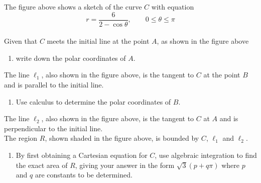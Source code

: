 \documentclass[leqno]{article}
\begin{document}
\begin{enumerate}[
  label=\textbf{\arabic*.},
  leftmargin=*,
  topsep=0pt,
  partopsep=0pt,
  parsep=0pt
]
The figure above shows a sketch of the curve $C$ with equation
\[
r = \frac{6}{2 - \cos \theta}, \qquad 0 \leq \theta \leq \pi
\]
\\
Given that $C$ meets the initial line at the point $A$, as shown in the figure above \\
\begin{enumerate}[label=\textbf{(\alph*)}]
  \item write down the polar coordinates of $A$.  \\
\end{enumerate}
The line $\ell_1$, also shown in the figure above, is the tangent to $C$ at the point $B$ and is parallel to the initial line. \\
\begin{enumerate}[label=\textbf{(\alph*)}, resume]
  \item Use calculus to determine the polar coordinates of $B$.  \\
\end{enumerate}
The line $\ell_2$, also shown in the figure above, is the tangent to $C$ at $A$ and is perpendicular to the initial line. \\

The region $R$, shown shaded in the figure above, is bounded by $C$, $\ell_1$ and $\ell_2$. \\
\begin{enumerate}[label=\textbf{(\alph*)}, resume]
  \item By first obtaining a Cartesian equation for $C$, use algebraic integration to find the exact area of $R$, giving your answer in the form $\sqrt{3}(p + q\pi)$ where $p$ and $q$ are constants to be determined.  \\
\end{enumerate}


\end{enumerate}
\end{document}

